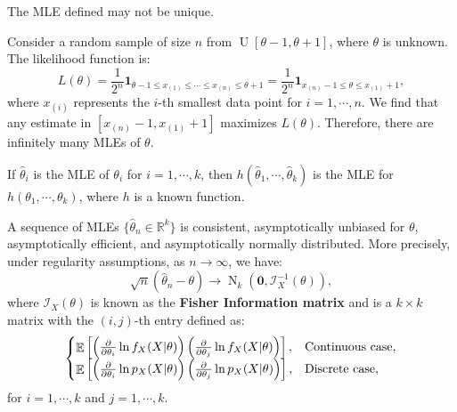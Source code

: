 \documentclass{huhtakm-template-book-v2}
\DeclareMathOperator{\E}{\mathbb{E}}
\DeclareMathOperator{\N}{N}
\DeclareMathOperator{\U}{U}
\begin{document}
    \begin{rem}
        The MLE defined may not be unique.
    \end{rem}
    \begin{eg}
        Consider a random sample of size $n$ from $\U[\theta - 1, \theta + 1]$, where $\theta$ is unknown. The likelihood function is:
        \begin{equation*}
            L(\theta) = \frac{1}{2^{n}} \mathbf{1}_{\theta - 1 \leq x_{(1)} \leq \cdots \leq x_{(n)} \leq \theta + 1} = \frac{1}{2^{n}} \mathbf{1}_{x_{(n)} - 1 \leq \theta \leq x_{(1)} + 1},
        \end{equation*}
        where $x_{(i)}$ represents the $i$-th smallest data point for $i = 1, \cdots, n$. We find that any estimate in $[x_{(n)} - 1, x_{(1)} + 1]$ maximizes $L(\theta)$. Therefore, there are infinitely many MLEs of $\theta$.
    \end{eg}
    \begin{lem}
        If $\hat{\theta}_{i}$ is the MLE of $\theta_{i}$ for $i = 1, \cdots, k$, then $h(\hat{\theta}_{1}, \cdots, \hat{\theta}_{k})$ is the MLE for $h(\theta_{1}, \cdots, \theta_{k})$, where $h$ is a known function.
    \end{lem}
    \begin{thm}
        \label{Chapter 2 (Theorem) Sequence of MLE is asympt. normal}
        A sequence of MLEs $\{\hat{\theta}_{n} \in \mathbb{R}^{k}\}$ is consistent, asymptotically unbiased for $\theta$, asymptotically efficient, and asymptotically normally distributed. More precisely, under regularity assumptions, as $n \to \infty$, we have:
        \begin{equation*}
            \sqrt{n}(\hat{\theta}_{n} - \theta) \to \N_{k}(\mathbf{0}, \mathcal{I}_{X}^{-1}(\theta)),
        \end{equation*}
        where $\mathcal{I}_{X}(\theta)$ is known as the \textbf{Fisher Information matrix} and is a $k \times k$ matrix with the $(i, j)$-th entry defined as:
        \begin{equation*}
            \begin{cases}
                \E\left[\left(\pdv*{\ln{f_{X}(X | \theta)}}{\theta_{i}}\right)\left(\pdv*{\ln{f_{X}(X | \theta)}}{\theta_{j}}\right)\right], &\text{Continuous case},\\
                \E\left[\left(\pdv*{\ln{p_{X}(X | \theta)}}{\theta_{i}}\right)\left(\pdv*{\ln{p_{X}(X | \theta)}}{\theta_{j}}\right)\right], &\text{Discrete case},
            \end{cases}
        \end{equation*}
        for $i = 1, \cdots, k$ and $j = 1, \cdots, k$.
    \end{thm}
\end{document}
